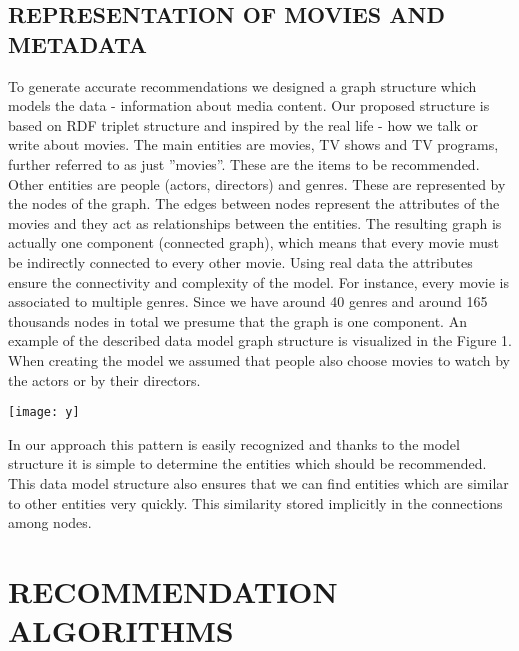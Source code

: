 \documentclass[10pt,slovak,a4paper]{article}
\begin{document}
\begin{multicols}{2}
\begin{small}

\centering \section{REPRESENTATION OF MOVIES AND METADATA}

\end{small}

 To generate accurate recommendations we designed a graph structure which models the data - information about media content. Our proposed structure is based on RDF triplet structure and inspired by the real life - how we talk or write about movies.
The main entities are movies, TV shows and TV programs, further referred to as just ”movies”. These are the items to be recommended. Other entities are people (actors, directors) and genres. These are represented by the nodes of the graph. The edges between nodes represent the attributes of the movies and they act as relationships between the entities. The resulting graph is actually one component (connected graph), which means that every movie must be indirectly connected to every other movie. Using real data the attributes ensure the connectivity and complexity of the model. For instance, every movie is associated to multiple genres. Since we have around 40 genres and around 165 thousands nodes in total we presume that the graph is one component. An example of the described data model graph structure is visualized in the Figure 1.
When creating the model we assumed that people also choose movies to watch by the actors or by their directors.


\texttt{[image: y]}

 

In our approach this pattern is easily recognized and thanks to the model structure it is simple to determine the entities which should be recommended. This data model structure also ensures that we can find entities which are similar to other entities very quickly. This similarity stored implicitly in the connections among nodes.

 



\centering \section{RECOMMENDATION ALGORITHMS}



\end{multicols}
\end{document}
